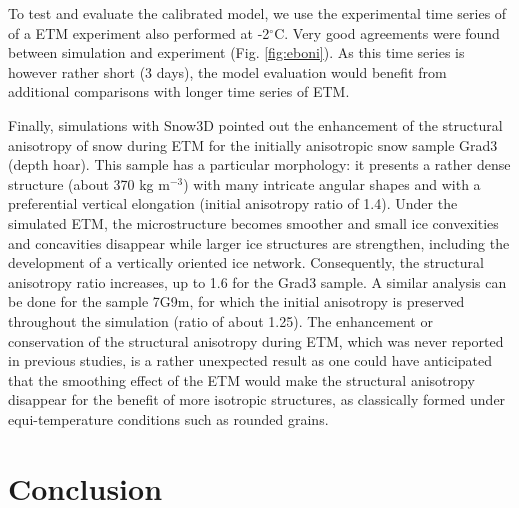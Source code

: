 \documentclass[draft,ms]{agujournal2019}
\begin{document}
To test and evaluate the calibrated model, we use the experimental time series of  of a ETM experiment also performed at -2$^\circ$C. Very good agreements were found between simulation and experiment (Fig. \ref{fig:eboni}). As this time series is however rather short (3 days), the model evaluation would benefit from additional comparisons with longer time series of ETM.


Finally, simulations with Snow3D pointed out the enhancement of the structural anisotropy of snow during ETM for the initially anisotropic snow sample Grad3 (depth hoar). This sample has a particular morphology: it presents a rather dense structure (about 370 kg m$^{-3}$) with many intricate angular shapes and with a preferential vertical elongation (initial anisotropy ratio of 1.4).
Under the simulated ETM, the microstructure becomes smoother and small ice convexities and concavities disappear while larger ice structures are strengthen, including the development of a vertically oriented ice network. Consequently, the structural anisotropy ratio increases, up to 1.6 for the Grad3 sample. A similar analysis can be done for the sample 7G9m, for which the initial anisotropy is preserved throughout the simulation (ratio of about 1.25). The enhancement or conservation of the structural anisotropy during ETM, which was never reported in previous studies, is a rather unexpected result as one could have anticipated that the smoothing effect of the ETM would make the structural anisotropy disappear for the benefit of more isotropic structures, as classically formed under equi-temperature conditions such as rounded grains. %

\section{Conclusion}
\label{sec:conclusion}
\end{document}
